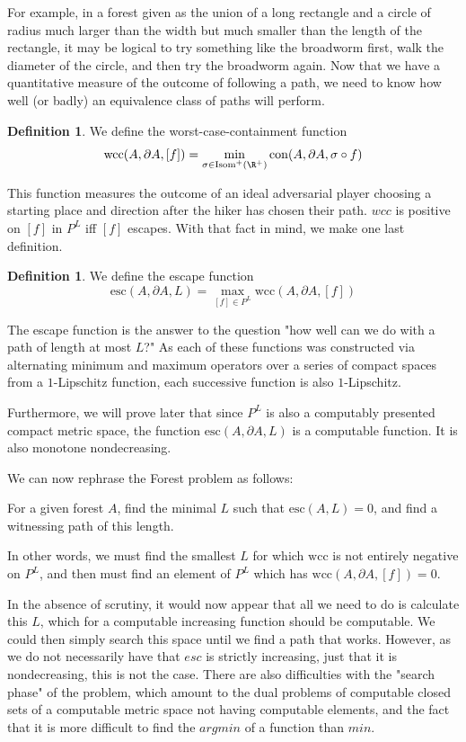 \documentclass{journal}
\theoremstyle{definition}
\newtheorem{dfn}[thm]{Definition}
\begin{document}
For example, in a forest given as the union of a long rectangle and a circle of radius much larger than the width but much smaller than the length of the rectangle, it may be logical to try something like the broadworm first, walk the diameter of the circle, and then try the broadworm again.  Now that we have a quantitative measure of the outcome of following a path, we need to know how well (or badly) an equivalence class of paths will perform. 

\begin{dfn} We define the worst-case-containment function
$$\mathrm{wcc}(A,\partial A, [f]) = \min_{\sigma\in \mathrm{Isom}^+(\R^+)} \mathrm{con}(A,\partial A, \sigma\circ f)$$
\end{dfn}
\label{dfn:wcc}
This function measures the outcome of an ideal adversarial player choosing a starting place and direction after the hiker has chosen their path. $wcc$ is positive on $[f]$ in $P^L$ iff $[f]$ escapes. With that fact in mind, we make one last definition.

\begin{dfn} We define the escape function
$$\mathrm{esc}(A,\partial A ,L) = \max_{[f]\in P^L}\mathrm{wcc}(A,\partial A, [f])$$
\end{dfn}
\label{dfn:esc}
The escape function is the answer to the question "how well can we do with a path of length at most $L$?" As each of these functions was constructed via alternating minimum and maximum operators over a series of compact spaces from a $1$-Lipschitz function, each successive function is also $1$-Lipschitz.

Furthermore, we will prove later that since $P^L$ is also a computably presented compact metric space, the function $\mathrm{esc}(A,\partial A, L)$ is a computable function. It is also monotone nondecreasing.

We can now rephrase the Forest problem as follows:

\begin{center}
    For a given forest $A$, find the minimal $L$ such that $\mathrm{esc}(A,L) = 0$, and find a witnessing path of this length.
\end{center}

In other words, we must find the smallest $L$ for which $\mathrm{wcc}$ is not entirely negative on $P^{L}$, and then must find an element of $P^L$ which has $\mathrm{wcc}(A,\partial A,[f]) = 0$.

In the absence of scrutiny, it would now appear that all we need to do is calculate this $L$, which for a computable increasing function should be computable. We could then simply search this space until we find a path that works. However, as we do not necessarily have that $esc$ is strictly increasing, just that it is nondecreasing, this is not the case. There are also difficulties with the "search phase" of the problem, which amount to the dual problems of computable closed sets of a computable metric space not having computable elements, and the fact that it is more difficult to find the $argmin$ of a function than $min$.
\end{document}

